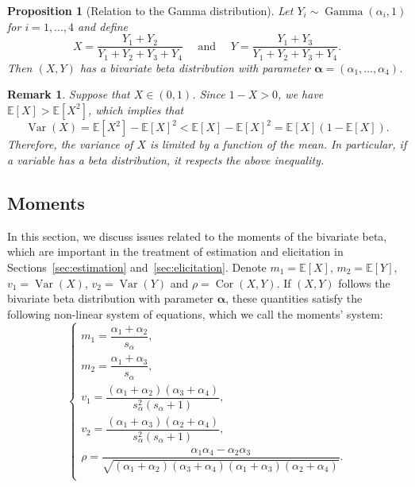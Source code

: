\documentclass[a4paper, notitlepage, 10pt]{article}
\newcommand{\ev}{\mathbb{E}}
\newcommand{\var}{\operatorname{Var}}
\newcommand{\cor}{\operatorname{Cor}}
\newtheorem{proposition}{Proposition}[]
\newtheorem{remark}{Remark}[]
\theoremstyle{definition}
\begin{document}
\begin{proposition}[Relation to the Gamma distribution]\label{prop:relation-gamma}
    Let $Y_i \sim \operatorname{Gamma}(\alpha_i, 1)$ for $i=1, \dots, 4$ and define
    \[
    X = \frac{Y_1 + Y_2}{Y_1 + Y_2 + Y_3 + Y_4} \quad \text{ and } \quad Y = \frac{Y_1 + Y_3}{Y_1 + Y_2 + Y_3 + Y_4}.
    \]
    Then $(X,Y)$ has a bivariate beta distribution with parameter $\boldsymbol{\alpha} = (\alpha_1, \dots, \alpha_4)$.
\end{proposition}

\begin{remark}\label{remark:inequality-beta}
    Suppose that $X \in (0,1)$. 
    Since $1-X > 0$, we have $\ev[X] > \ev[X^2]$, which implies that 
    \[
    \var(X) = \ev[X^2] - {\ev[X]}^2 < \ev[X] - {\ev[X]}^2 = \ev[X](1 - \ev[X]).
    \]
    Therefore, the variance of $X$ is limited by a function of the mean.
    In particular, if a variable has a beta distribution, it respects the above inequality.
\end{remark}

\subsection{Moments}\label{sec:moments}

In this section, we discuss issues related to the moments of the bivariate beta, which are important in the treatment of estimation and elicitation in Sections~\ref{sec:estimation} and~\ref{sec:elicitation}. 
Denote $m_1 = \ev[X]$, $m_2 = \ev[Y]$, $v_1 = \var(X)$, $v_2 = \var(Y)$ and $\rho = \cor(X,Y)$.
If $(X, Y)$ follows the bivariate beta distribution with parameter $\boldsymbol{\alpha}$, these quantities satisfy the following non-linear system of equations, which we call the moments' system:
\begin{equation}
  \label{eq:system-moments-alpha}
  \begin{cases}
    m_1 = \dfrac{\alpha_1+\alpha_2}{s_{\alpha}}, \\[10pt]
    m_2 = \dfrac{\alpha_1+\alpha_3}{s_{\alpha}}, \\[10pt]
    v_1 = \dfrac{(\alpha_1+\alpha_2)(\alpha_3+\alpha_4)}{s_{\alpha}^2(s_{\alpha}+1)}, \\[10pt]
    v_2 = \dfrac{(\alpha_1+\alpha_3)(\alpha_2+\alpha_4)}{s_{\alpha}^2(s_{\alpha}+1)}, \\[10pt]
    \rho = \dfrac{\alpha_1\alpha_4 - \alpha_2\alpha_3}{\sqrt{(\alpha_1+\alpha_2)(\alpha_3+\alpha_4)(\alpha_1+\alpha_3)(\alpha_2+\alpha_4)}}.\\
  \end{cases}
\end{equation}
\end{document}
